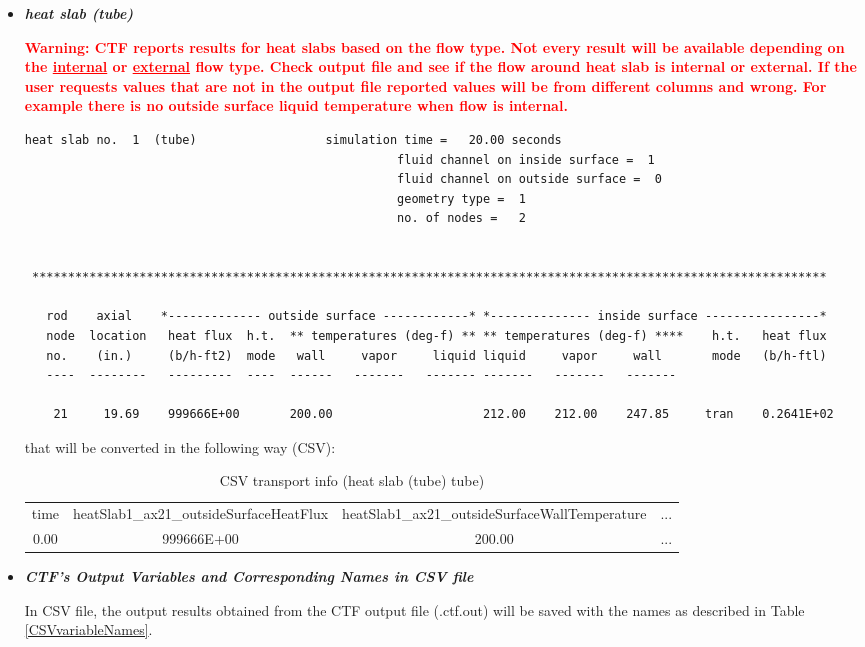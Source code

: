 \begin{itemize}
  \item \textit{\textbf{heat slab (tube)}}

   \noindent \textcolor{red}{
   \textbf{Warning: CTF reports results for heat slabs based on the flow type. Not every result will be available depending on the \underline{internal} or \underline{external} flow type. Check output file and see if the flow around heat slab is internal or external. If the user requests values that are not in the output file reported values will be from different columns and wrong. For example there is no outside surface liquid temperature when flow is internal.} } \\

   \begin{lstlisting}[basicstyle=\tiny]
          heat slab no.  1  (tube)                  simulation time =   20.00 seconds
                                                    fluid channel on inside surface =  1
                                                    fluid channel on outside surface =  0
                                                    geometry type =  1
                                                    no. of nodes =   2


 ***************************************************************************************************************

   rod    axial    *------------- outside surface ------------* *-------------- inside surface ----------------*
   node  location   heat flux  h.t.  ** temperatures (deg-f) ** ** temperatures (deg-f) ****    h.t.   heat flux
   no.    (in.)     (b/h-ft2)  mode   wall     vapor     liquid liquid     vapor     wall       mode   (b/h-ftl)
   ----  --------   ---------  ----  ------   -------   ------- -------   -------   -------

    21     19.69    999666E+00       200.00                     212.00    212.00    247.85     tran    0.2641E+02
  \end{lstlisting}
    that will be converted in the following way (CSV):
    \begin{table}[h]
      \centering
      \caption{CSV transport info (heat slab (tube) tube)}
      \label{CSVheatSlab}
      \tabcolsep=0.11cm
      \tiny
      \begin{tabular}{|c|c|c|c|}
      time    & heatSlab1\_ax21\_outsideSurfaceHeatFlux &  heatSlab1\_ax21\_outsideSurfaceWallTemperature &  ...  \\
      0.00 & 999666E+00 & 200.00  & ...
      \end{tabular}
    \end{table}

 \item \textit{\textbf{CTF's Output Variables and Corresponding Names in CSV file}}

   In CSV file, the output results obtained from the CTF output file (.ctf.out) will be saved with the names as described in Table \ref{CSVvariableNames}.

\end{itemize}

